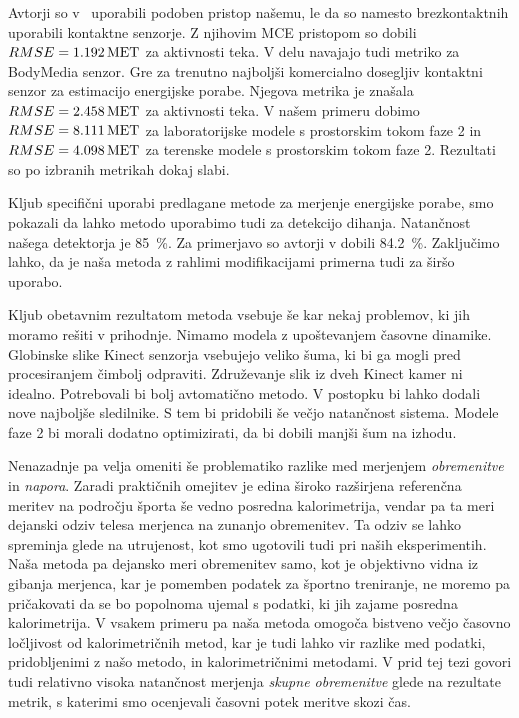 Avtorji so v~\cite{gjoreski2015context} uporabili podoben pristop našemu, le da so namesto brezkontaktnih uporabili kontaktne senzorje. Z njihovim MCE pristopom so dobili ${RMSE}=\SI{1.192}{MET}$ za aktivnosti teka. V delu navajajo tudi metriko za BodyMedia senzor. Gre za trenutno najboljši komercialno dosegljiv kontaktni senzor za estimacijo energijske porabe. Njegova metrika je znašala ${RMSE}=\SI{2.458}{MET}$ za aktivnosti teka. V našem primeru dobimo ${RMSE}=\SI{8.111}{MET}$ za laboratorijske modele s prostorskim tokom faze 2 in ${RMSE}=\SI{4.098}{MET}$ za terenske modele s prostorskim tokom faze 2. Rezultati so po izbranih metrikah dokaj slabi. 

Kljub specifični uporabi predlagane metode za merjenje energijske porabe, smo pokazali da lahko metodo uporabimo tudi za detekcijo dihanja. Natančnost našega detektorja je \SI{85}{\%}. Za primerjavo so avtorji v \cite{nakajima2001development} dobili \SI{84.2}{\%}. Zaključimo lahko, da je naša metoda z rahlimi modifikacijami primerna tudi za širšo uporabo.

Kljub obetavnim rezultatom metoda vsebuje še kar nekaj problemov, ki jih moramo rešiti v prihodnje. Nimamo modela z upoštevanjem časovne dinamike. Globinske slike Kinect senzorja vsebujejo veliko šuma, ki bi ga mogli pred procesiranjem čimbolj odpraviti. Združevanje slik iz dveh Kinect kamer ni idealno. Potrebovali bi bolj avtomatično metodo. V postopku bi lahko dodali nove najboljše sledilnike. S tem bi pridobili še večjo natančnost sistema. Modele faze 2 bi morali dodatno optimizirati, da bi dobili manjši šum na izhodu.

Nenazadnje pa velja omeniti še problematiko razlike med merjenjem \emph{obremenitve} in \emph{napora}. Zaradi praktičnih omejitev je edina široko razširjena referenčna meritev na področju športa še vedno posredna kalorimetrija, vendar pa ta meri dejanski odziv telesa merjenca na zunanjo obremenitev. Ta odziv se lahko spreminja glede na utrujenost, kot smo ugotovili tudi pri naših eksperimentih. Naša metoda pa dejansko meri obremenitev samo, kot je objektivno vidna iz gibanja merjenca, kar je pomemben podatek za športno treniranje, ne moremo pa pričakovati da se bo popolnoma ujemal s podatki, ki jih zajame posredna kalorimetrija. V vsakem primeru pa naša metoda omogoča bistveno večjo časovno ločljivost od kalorimetričnih metod, kar je tudi lahko vir razlike med podatki, pridobljenimi z našo metodo, in kalorimetričnimi metodami. V prid tej tezi govori tudi relativno visoka natančnost merjenja \emph{skupne obremenitve} glede na rezultate metrik, s katerimi smo ocenjevali časovni potek meritve skozi čas.